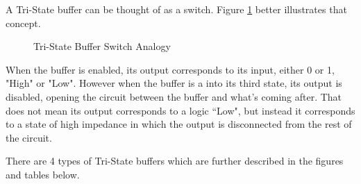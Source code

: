 A Tri-State buffer can be thought of as a switch. Figure \ref{fig:tristate} better illustrates that concept.
\begin{figure}[htp]
	\begin{center}
	\hfill
	\caption{Tri-State Buffer Switch Analogy}
	\label{fig:tristate}
	\end{center}
\end{figure}


When the buffer is enabled, its output corresponds to its input, either 0 or 1, "High" or "Low". However when the buffer is a into its third state, its output is disabled, opening the circuit between the buffer and what’s coming after. That does not mean its output corresponds to a logic “Low", but instead it corresponds to a state of high impedance in which the output is disconnected from the rest of the circuit. 

There are 4 types of Tri-State buffers which are further described in the figures and tables below.
\newpage

\vspace{10mm}

